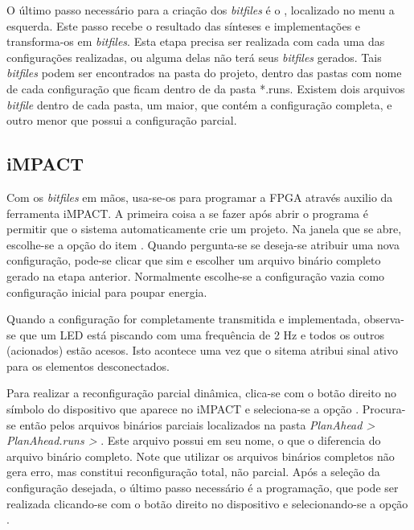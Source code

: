 \documentclass[11pt,a4paper,oneside]{book}
\begin{document}
O último passo necessário para a criação dos \textit{bitfiles} é o , localizado no menu a esquerda.
Este passo recebe o resultado das sínteses e implementações e transforma-os em \textit{bitfiles}.
Esta etapa precisa ser realizada com cada uma das configurações realizadas, ou alguma delas não terá seus \textit{bitfiles} gerados.
Tais \textit{bitfiles} podem ser encontrados na pasta do projeto, dentro das pastas com nome de cada configuração que ficam dentro de da pasta *.runs.
Existem dois arquivos \textit{bitfile} dentro de cada pasta, um maior, que contém a configuração completa, e outro menor que possui a configuração parcial.

\subsection{iMPACT}
Com os \textit{bitfiles} em mãos, usa-se-os para programar a FPGA através auxilio da ferramenta iMPACT. 
A primeira coisa a se fazer após abrir o programa é permitir que o sistema automaticamente crie um projeto.
Na janela que se abre, escolhe-se a opção  do item .
Quando pergunta-se se deseja-se atribuir uma nova configuração, pode-se clicar que sim e escolher um arquivo binário completo gerado na etapa anterior.
Normalmente escolhe-se a configuração vazia como configuração inicial para poupar energia.

Quando a configuração for completamente transmitida e implementada, observa-se que um LED está piscando com uma frequência de 2 Hz e todos os outros (acionados) estão acesos.
Isto acontece uma vez que o sitema atribui sinal ativo para os elementos desconectados.

Para realizar a reconfiguração parcial dinâmica, clica-se com o botão direito no símbolo do dispositivo que aparece no iMPACT e seleciona-se a opção .
Procura-se então pelos arquivos binários parciais localizados na pasta \textit{PlanAhead > PlanAhead.runs >} .
Este arquivo possui  em seu nome, o que o diferencia do arquivo binário completo.
Note que utilizar os arquivos binários completos não gera erro, mas constitui reconfiguração total, não parcial.
Após a seleção da configuração desejada, o último passo necessário é a programação, que pode ser realizada clicando-se com o botão direito no dispositivo e selecionando-se a opção .
\end{document}
